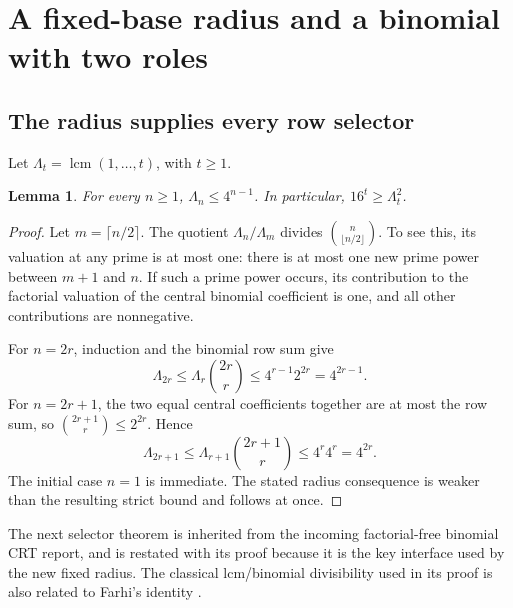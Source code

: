 \documentclass[11pt]{article}
\newtheorem{lemma}[theorem]{Lemma}
\theoremstyle{remark}\newtheorem{remark}[theorem]{Remark}
\newcommand{\lcm}{\operatorname{lcm}}
\begin{document}
\section{A fixed-base radius and a binomial with two roles}

\subsection{The radius supplies every row selector}

Let $\Lambda_t=\lcm(1,\ldots,t)$, with $t\ge1$.

\begin{lemma}\label{lem:lcm}
For every $n\ge1$, $\Lambda_n\le4^{n-1}$. In particular,
$16^t\ge\Lambda_t^2$.
\end{lemma}
\begin{proof}
Let $m=\lceil n/2\rceil$. The quotient $\Lambda_n/\Lambda_m$
divides $\binom{n}{\lfloor n/2\rfloor}$. To see this, its valuation
at any prime is at most one: there is at most one new prime power
between $m+1$ and $n$. If such a prime power occurs, its contribution
to the factorial valuation of the central binomial coefficient is one,
and all other contributions are nonnegative.

For $n=2r$, induction and the binomial row sum give
\[
 \Lambda_{2r}\le\Lambda_r\binom{2r}{r}
 \le4^{r-1}2^{2r}=4^{2r-1}.
\]
For $n=2r+1$, the two equal central coefficients together are at most
the row sum, so $\binom{2r+1}{r}\le2^{2r}$. Hence
\[
 \Lambda_{2r+1}\le\Lambda_{r+1}\binom{2r+1}{r}
 \le4^r4^r=4^{2r}.
\]
The initial case $n=1$ is immediate. The stated radius consequence
is weaker than the resulting strict bound and follows at once.
\end{proof}

The next selector theorem is inherited from the incoming factorial-free
binomial CRT report, and is restated with its proof because it is the
key interface used by the new fixed radius. The classical lcm/binomial
divisibility used in its proof is also related to Farhi's identity
\cite{farhi}.
\end{document}
